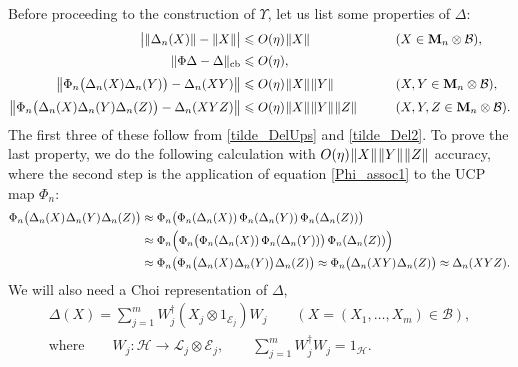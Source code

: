 \documentclass[12pt]{article}
\newcommand{\calB}{\mathcal{B}}
\newcommand{\calE}{\mathcal{E}}
\newcommand{\calH}{\mathcal{H}}
\newcommand{\calL}{\mathcal{L}}
\newcommand{\ts}{\mkern1mu}
\newcommand{\cb}{\mathrm{cb}}
\newcommand*{\Ma}[1]{\mathbf{M}_{#1}}
\renewcommand{\le}{\leqslant}
\newtheorem[definition]{Definition}[Theorem]{Definition}
\newtheorem[remark]{Example}[Theorem]{Example}
\newtheorem[remark]{Remark}[Theorem]{Remark}
\newtheorem[remark]{Question}[Theorem]{Open question}
\newtheorem*[definition]{definition}{Definition}
\newtheorem*[remark]{example}{Example}
\newtheorem*[remark]{remark}{Remark}
\newtheorem*[remark]{question}{Open question}
\numberwithin{equation}{section}
\begin{document}
Before proceeding to the construction of $\Upsilon$, let us list some properties of $\Delta$:
\begin{alignat}{2}
\label{Delta_norm}
\bigl|\|\Delta_n(X)\|-\|X\|\bigr|
&\le O(\eta)\ts\|X\|\qquad& &(X\in\Ma{n}\otimes\calB),\\[2pt]
\label{PhiDelta1}
\|\Phi\Delta-\Delta\|_\cb&\le O(\eta),\qquad& &\\[2pt]
\label{PhiDelta2}
\bigl\|\Phi_n\bigl(\Delta_n(X)\Delta_n(Y)\bigr)-\Delta_n(XY)\bigr\|
&\le O(\eta)\ts\|X\|\ts\|Y\|\qquad& &(X,Y\in\Ma{n}\otimes\calB),\\[2pt]
\label{PhiDelta3}
\bigl\|\Phi_n\bigl(\Delta_n(X)\Delta_n(Y)\Delta_n(Z)\bigr)-\Delta_n(XYZ)\bigr\|
&\le O(\eta)\ts\|X\|\ts\|Y\|\ts\|Z\|\qquad& &(X,Y,Z\in\Ma{n}\otimes\calB).
\end{alignat}
The first three of these follow from \eqref{tilde_DelUps} and \eqref{tilde_Del2}. To prove the last property, we do the following calculation with $O(\eta)\ts\|X\|\ts\|Y\|\ts\|Z\|$ accuracy, where the second step is the application of equation \eqref{Phi_assoc1} to the UCP map $\Phi_n$:
\[
\begin{aligned}
\Phi_n\bigl(\Delta_n(X)\ts\Delta_n(Y)\ts\Delta_n(Z)\bigr)
&\approx\Phi_n\bigl(\Phi_n(\Delta_n(X))\,\Phi_n(\Delta_n(Y))\,
\Phi_n(\Delta_n(Z))\bigr)\\
&\approx\Phi_n\Bigl(\Phi_n\bigl(\Phi_n(\Delta_n(X))\,\Phi_n(\Delta_n(Y))\bigr)\,
\Phi_n(\Delta_n(Z))\Bigr)\\
&\approx\Phi_n\bigl(\Phi_n\bigl(\Delta_n(X)\ts\Delta_n(Y)\bigr)\ts
\Delta_n(Z)\bigr)
\approx\Phi_n\bigl(\Delta_n(XY)\ts\Delta_n(Z)\bigr)
\approx\Delta_n(XYZ).
\end{aligned}
\]
We will also need a Choi representation of $\Delta$,
\begin{gather}
\label{Choi_Delta}
\Delta(X)=\sum_{j=1}^{m}W_j^\dag(X_j\otimes 1_{\calE_j})W_j\qquad
(X=(X_1,\dots,X_m)\in\calB),\\
\text{where}\qquad
W_j\colon\calH\to\calL_j\otimes\calE_j,\qquad \sum_{j=1}^{m}W_j^{\dag}W_j=1_{\calH}.
\end{gather}
\end{document}

